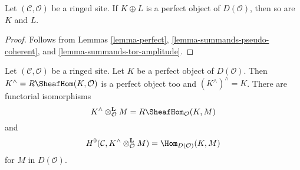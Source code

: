 \begin{lemma}
\label{lemma-summands-perfect}
Let $(\mathcal{C}, \mathcal{O})$ be a ringed site.
If $K \oplus L$ is a perfect object of $D(\mathcal{O})$, then
so are $K$ and $L$.
\end{lemma}

\begin{proof}
Follows from
Lemmas \ref{lemma-perfect}, \ref{lemma-summands-pseudo-coherent}, and
\ref{lemma-summands-tor-amplitude}.
\end{proof}

\begin{lemma}
\label{lemma-dual-perfect-complex}
Let $(\mathcal{C}, \mathcal{O})$ be a ringed site.
Let $K$ be a perfect object of $D(\mathcal{O})$.
Then $K^\wedge = R\SheafHom(K, \mathcal{O})$ is a
perfect object too and $(K^\wedge)^\wedge = K$. There are
functorial isomorphisms
$$
K^\wedge \otimes^\mathbf{L}_\mathcal{O} M = R\SheafHom_\mathcal{O}(K, M)
$$
and
$$
H^0(\mathcal{C}, K^\wedge \otimes_\mathcal{O}^\mathbf{L} M) =
\Hom_{D(\mathcal{O})}(K, M)
$$
for $M$ in $D(\mathcal{O})$.
\end{lemma}

